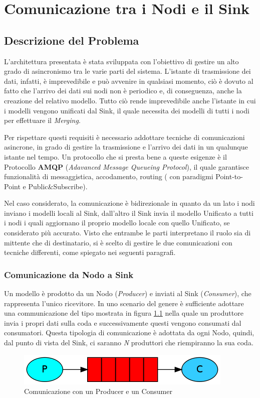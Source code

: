 \chapter{Comunicazione tra i Nodi e il Sink}
  \section{Descrizione del Problema}
    L'architettura presentata è stata sviluppata con l'obiettivo di gestire un alto grado di asincronismo tra le varie parti del sistema. L'istante di trasmissione dei dati, infatti, è imprevedibile e può avvenire in qualsiasi momento, ciò è dovuto al fatto che l'arrivo dei dati sui nodi non è periodico e, di conseguenza, anche la creazione del relativo modello. Tutto ciò rende imprevedibile anche l'istante in cui i modelli vengono unificati dal Sink, il quale necessita dei modelli di tutti i nodi per effettuare il \textit{Merging}.  \newline

    Per rispettare questi requisiti è necessario addottare tecniche di comunicazioni asincrone, in grado di gestire la trasmissione e l'arrivo dei dati in un qualunque istante nel tempo. Un protocollo che si presta bene a queste esigenze è il Protocollo \textbf{AMQP} (\textit{Adavanced Message Queueing Protocol}), il quale garantisce funzionalità di messaggistica, accodamento, routing ( con paradigmi Point-to-Point e Public\&Subscribe). \newline

    Nel caso considerato, la comunicazione è bidirezionale in quanto da un lato i nodi inviano i modelli locali al Sink, dall'altro il Sink invia il modello Unificato a tutti i nodi i quali aggiornano il proprio modello locale con quello Unificato, se considerato più accurato. Visto che entrambe le parti interpretano il ruolo sia di mittente che di destinatario, si è scelto di gestire le due comunicazioni con tecniche differenti, come spiegato nei seguenti paragrafi.
    \subsection{Comunicazione da Nodo a Sink}
      Un modello è prodotto da un Nodo (\textit{Producer}) e inviati al Sink (\textit{Consumer}), che rappresenta l'unico ricevitore. In uno scenario del genere è sufficiente adottare una communicazione del tipo mostrata in figura \ref{fig:ProducerConsumer} nella quale un produttore invia i propri dati sulla coda e successivamente questi vengono consumati dal consumatori. Questa tipologia di comunicazione è adottata da ogni Nodo, quindi, dal punto di vista del Sink, ci saranno \textit{N} produttori che riempiranno la sua coda.
      \begin{figure}[h!]
        \centering
        \includegraphics[scale=0.7]{../Immagini/ProducerConsumer.png}
        \caption{Comunicazione con un Producer e un Consumer}
        \label{fig:ProducerConsumer}
      \end{figure}

